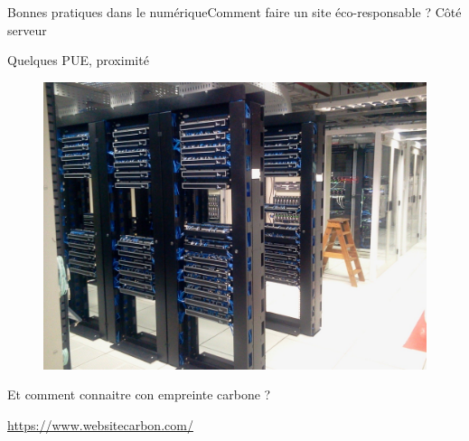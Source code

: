 \begin{frame}{Bonnes pratiques dans le numérique}{Comment faire un site éco-responsable ? Côté serveur}
\begin{block}{Quelques PUE, proximité}
\begin{minipage}[b]{0.6\linewidth}
\end{minipage}\hfill
\begin{minipage}[b]{0.35\linewidth}  
\begin{figure}
    \centering
    \includegraphics[scale=0.05]{Feathergraphics/datacenter.jpg}
\end{figure}
\end{minipage}\hfill
\end{block}
\begin{block}{Et comment connaitre con empreinte carbone ?}

\url{https://www.websitecarbon.com/}
\end{block}

\end{frame}